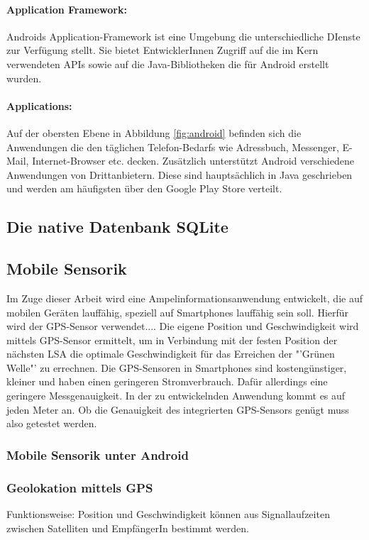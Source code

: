 \paragraph{Application Framework: }
Androids Application-Framework ist eine Umgebung die unterschiedliche DIenste zur Verfügung stellt. Sie bietet EntwicklerInnen Zugriff auf die im Kern verwendeten \glspl{API} sowie auf die Java-Bibliotheken die für Android erstellt wurden. 
\paragraph{Applications: }
Auf der obersten Ebene in Abbildung \ref{fig:android} befinden sich die Anwendungen die den täglichen Telefon-Bedarfs wie Adressbuch, Messenger, E-Mail, Internet-Browser etc. decken. Zusätzlich unterstützt Android verschiedene Anwendungen von Drittanbietern. Diese sind hauptsächlich in Java geschrieben und werden am häufigsten über den Google Play Store verteilt.
\subsection{Die native Datenbank SQLite}
\subsection{Mobile Sensorik} 
Im Zuge dieser Arbeit wird eine Ampelinformationsanwendung entwickelt, die auf mobilen Geräten lauffähig, speziell auf \glspl{Smartphone} lauffähig sein soll. Hierfür wird der \gls{GPS}-Sensor verwendet.... 
Die eigene Position und Geschwindigkeit wird mittels \gls{GPS}-Sensor ermittelt, um in Verbindung mit der festen Position der nächsten \gls{LSA} die optimale Geschwindigkeit für das Erreichen der "'Grünen Welle"' zu errechnen. Die \gls{GPS}-Sensoren in \glspl{Smartphone} sind kostengünstiger, kleiner und haben einen geringeren Stromverbrauch. Dafür allerdings eine geringere Messgenauigkeit. In der zu entwickelnden Anwendung kommt es auf jeden Meter an. Ob die Genauigkeit des integrierten \gls{GPS}-Sensors genügt muss also getestet werden. 
\subsubsection{Mobile Sensorik unter Android}
\subsubsection{Geolokation mittels \gls{GPS}}
Funktionsweise: Position und Geschwindigkeit können aus Signallaufzeiten zwischen Satelliten und EmpfängerIn bestimmt werden. 
